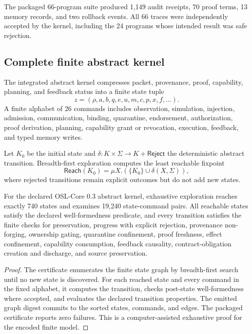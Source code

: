 The packaged 66-program suite produced 1,149 audit receipts, 70 proof terms, 13 memory records, and two rollback events.  All 66 traces were independently accepted by the kernel, including the 24 programs whose intended result was safe rejection.

\subsection{Complete finite abstract kernel}

The integrated abstract kernel compresses packet, provenance, proof, capability, planning, and feedback status into a finite state tuple
\[
z=(\rho,a,b,q,e,u,m,c,p,x,f,\ldots).
\]
A finite alphabet of 26 commands includes observation, simulation, injection, admission, communication, binding, quarantine, endorsement, authorization, proof derivation, planning, capability grant or revocation, execution, feedback, and typed memory writes.

Let \(K_0\) be the initial state and \(\delta:K\times\Sigma\to K+\mathsf{Reject}\) the deterministic abstract transition.  Breadth-first exploration computes the least reachable fixpoint
\[
\mathsf{Reach}(K_0)
=
\mu X.\left(\{K_0\}\cup\delta(X,\Sigma)\right),
\]
where rejected transitions remain explicit outcomes but do not add new states.

\begin{theorem}
\label{thm:integrated-kernel-certificate}
For the declared OSL-Core 0.3 abstract kernel, exhaustive exploration reaches exactly 740 states and examines 19,240 state-command pairs.  All reachable states satisfy the declared well-formedness predicate, and every transition satisfies the finite checks for preservation, progress with explicit rejection, provenance non-forging, ownership gating, quarantine confinement, proof freshness, effect confinement, capability consumption, feedback causality, contract-obligation creation and discharge, and source preservation.
\end{theorem}

\begin{proof}
The certificate enumerates the finite state graph by breadth-first search until no new state is discovered.  For each reached state and every command in the fixed alphabet, it computes the transition, checks post-state well-formedness where accepted, and evaluates the declared transition properties.  The emitted graph digest commits to the sorted states, commands, and edges.  The packaged certificate reports zero failures.  This is a computer-assisted exhaustive proof for the encoded finite model.  \qedhere
\end{proof}

